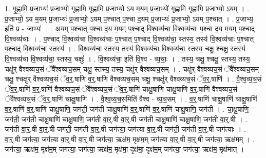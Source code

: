 \documentclass[17pt]{extarticle}
\begin{document}
1. गृ॒ह्णा॒मि॒ प्र॒जाभ्यः॑ प्र॒जाभ्यो॑ गृह्णामि गृह्णामि प्र॒जाभ्यो॒ ऽय म॒यम् प्र॒जाभ्यो॑ गृह्णामि गृह्णामि प्र॒जाभ्यो॒ ऽयम् । . प्र॒जाभ्यो॒ ऽय म॒यम् प्र॒जाभ्यः॑ प्र॒जाभ्यो॒ ऽयम् प॒श्चात् प॒श्चा द॒यम् प्र॒जाभ्यः॑ प्र॒जाभ्यो॒ ऽयम् प॒श्चात् । . प्र॒जाभ्य॒ इति॑ प्र - जाभ्यः॑ । . अ॒यम् प॒श्चात् प॒श्चा द॒य म॒यम् प॒श्चाद् वि॒श्वव्य॑चा वि॒श्वव्य॑चाः प॒श्चा द॒य म॒यम् प॒श्चाद् वि॒श्वव्य॑चाः । . प॒श्चाद् वि॒श्वव्य॑चा वि॒श्वव्य॑चाः प॒श्चात् प॒श्चाद् वि॒श्वव्य॑चा॒ स्तस्य॒ तस्य॑ वि॒श्वव्य॑चाः प॒श्चात् प॒श्चाद् वि॒श्वव्य॑चा॒ स्तस्य॑ । . वि॒श्वव्य॑चा॒ स्तस्य॒ तस्य॑ वि॒श्वव्य॑चा वि॒श्वव्य॑चा॒ स्तस्य॒ चक्षु॒ श्चक्षु॒ स्तस्य॑ वि॒श्वव्य॑चा वि॒श्वव्य॑चा॒ स्तस्य॒ चक्षुः॑ । . वि॒श्वव्य॑चा॒ इति॑ वि॒श्व - व्य॒चाः॒ । . तस्य॒ चक्षु॒ श्चक्षु॒ स्तस्य॒ तस्य॒ चक्षु॑र् वैश्वव्यच॒सं ॅवै᳚श्वव्यच॒सम् चक्षु॒ स्तस्य॒ तस्य॒ चक्षु॑र् वैश्वव्यच॒सम् । . चक्षु॑र् वैश्वव्यच॒सं ॅवै᳚श्वव्यच॒सम् चक्षु॒ श्चक्षु॑र् वैश्वव्यच॒सं ॅव॒र्॒.षाणि॑ व॒र्॒.षाणि॑ वैश्वव्यच॒सम् चक्षु॒ श्चक्षु॑र् वैश्वव्यच॒सं ॅव॒र्॒.षाणि॑ । . वै॒श्व॒व्य॒च॒सं ॅव॒र्॒.षाणि॑ व॒र्॒.षाणि॑ वैश्वव्यच॒सं ॅवै᳚श्वव्यच॒सं ॅव॒र्॒.षाणि॑ चाक्षु॒षाणि॑ चाक्षु॒षाणि॑ व॒र्॒.षाणि॑ वैश्वव्यच॒सं ॅवै᳚श्वव्यच॒सं ॅव॒र्॒.षाणि॑ चाक्षु॒षाणि॑ । . वै॒श्व॒व्य॒च॒समिति॑ वैश्व - व्य॒च॒सम् । . व॒र्॒.षाणि॑ चाक्षु॒षाणि॑ चाक्षु॒षाणि॑ व॒र्॒.षाणि॑ व॒र्॒.षाणि॑ चाक्षु॒षाणि॒ जग॑ती॒ जग॑ती चाक्षु॒षाणि॑ व॒र्॒.षाणि॑ व॒र्॒.षाणि॑ चाक्षु॒षाणि॒ जग॑ती । . चा॒क्षु॒षाणि॒ जग॑ती॒ जग॑ती चाक्षु॒षाणि॑ चाक्षु॒षाणि॒ जग॑ती वा॒र्॒.षी वा॒र्॒.षी जग॑ती चाक्षु॒षाणि॑ चाक्षु॒षाणि॒ जग॑ती वा॒र्॒.षी । . जग॑ती वा॒र्॒.षी वा॒र्॒.षी जग॑ती॒ जग॑ती वा॒र्॒.षी जग॑त्या॒ जग॑त्या वा॒र्॒.षी जग॑ती॒ जग॑ती वा॒र्॒.षी जग॑त्याः । . वा॒र्॒.षी जग॑त्या॒ जग॑त्या वा॒र्॒.षी वा॒र्॒.षी जग॑त्या॒ ऋक्ष॑म॒ मृक्ष॑म॒म् जग॑त्या वा॒र्॒.षी वा॒र्॒.षी जग॑त्या॒ ऋक्ष॑मम् । . जग॑त्या॒ ऋक्ष॑म॒ मृक्ष॑म॒म् जग॑त्या॒ जग॑त्या॒ ऋक्ष॑म॒ मृक्ष॑मा॒ दृक्ष॑मा॒ दृक्ष॑म॒म् जग॑त्या॒ जग॑त्या॒ ऋक्ष॑म॒ मृक्ष॑मात् । \newline
\end{document}
